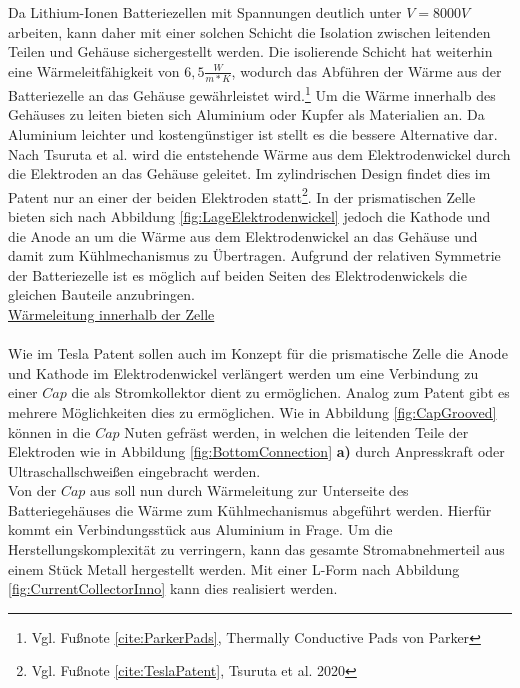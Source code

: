 Da Lithium-Ionen Batteriezellen mit Spannungen deutlich unter $V = 8000 V$ arbeiten, kann daher mit einer solchen Schicht die Isolation zwischen leitenden Teilen und Gehäuse sichergestellt werden. Die isolierende Schicht hat weiterhin eine Wärmeleitfähigkeit von $6,5 \frac{W}{m * K}$, wodurch das Abführen der Wärme aus der Batteriezelle an das Gehäuse gewährleistet wird.\footnote{Vgl. Fußnote \ref{cite:ParkerPads}, Thermally Conductive Pads von Parker} Um die Wärme innerhalb des Gehäuses zu leiten bieten sich Aluminium oder Kupfer als Materialien an. Da Aluminium leichter und kostengünstiger ist stellt es die bessere Alternative dar.\\
Nach Tsuruta et al. wird die entstehende Wärme aus dem Elektrodenwickel durch die Elektroden an das Gehäuse geleitet. Im zylindrischen Design findet dies im Patent nur an einer der beiden Elektroden statt\footnote{Vgl. Fußnote \ref{cite:TeslaPatent}, Tsuruta et al. 2020}. In der prismatischen Zelle bieten sich nach Abbildung \ref{fig:LageElektrodenwickel} jedoch die Kathode und die Anode an um die Wärme aus dem Elektrodenwickel an das Gehäuse und damit zum Kühlmechanismus zu Übertragen. Aufgrund der relativen Symmetrie der Batteriezelle ist es möglich auf beiden Seiten des Elektrodenwickels die gleichen Bauteile anzubringen.\\

\underline{Wärmeleitung innerhalb der Zelle}\\
\\

Wie im Tesla Patent sollen auch im Konzept für die prismatische Zelle die Anode und Kathode im Elektrodenwickel verlängert werden um eine Verbindung zu einer $Cap$ die als Stromkollektor dient zu ermöglichen. Analog zum Patent gibt es mehrere Möglichkeiten dies zu ermöglichen. Wie in Abbildung \ref{fig:CapGrooved} können in die $Cap$ Nuten gefräst werden, in welchen die leitenden Teile der Elektroden wie in Abbildung \ref{fig:BottomConnection} \textbf{a)} durch Anpresskraft oder Ultraschallschweißen eingebracht werden.\\
Von der $Cap$ aus soll nun durch Wärmeleitung zur Unterseite des Batteriegehäuses die Wärme zum Kühlmechanismus abgeführt werden. Hierfür kommt ein Verbindungsstück aus Aluminium in Frage. Um die Herstellungskomplexität zu verringern, kann das gesamte Stromabnehmerteil aus einem Stück Metall hergestellt werden. Mit einer L-Form nach Abbildung \ref{fig:CurrentCollectorInno} kann dies realisiert werden.\\

